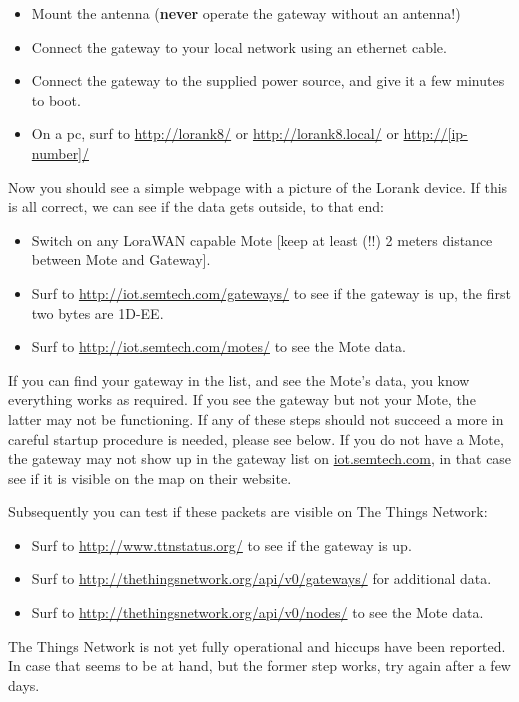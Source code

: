 \documentclass[12pt]{article}
\begin{document}
\begin{itemize}
\item Mount the antenna ({\bf never} operate the gateway without an antenna!)
\item Connect the gateway to your local network using an ethernet cable.
\item Connect the gateway to the supplied power source, and give it a few minutes to boot.
\item On a pc, surf to \url{http://lorank8/} or \url{http://lorank8.local/} or \url{http://[ip-number]/}
\end{itemize}

Now you should see a simple webpage with a picture of the Lorank device. 
If this is all correct, we can see if the data gets outside, to that end:

\begin{itemize}
\item Switch on any LoraWAN capable Mote [keep at least (!!) 2 meters distance between Mote and Gateway].
\item Surf to \url{http://iot.semtech.com/gateways/} to see if the gateway is up, the first two bytes are 1D-EE.
\item Surf to \url{http://iot.semtech.com/motes/} to see the Mote data.  
\end{itemize}
If you can find your gateway in the list, and see the Mote's data, you know everything works
as required. If you see the gateway but not your Mote, the latter may not be functioning.
If any of these steps should not succeed a more in careful startup procedure is needed, please see below.
If you do not have a Mote, the gateway may not show up in the gateway list on \url{iot.semtech.com},
in that case see if it is visible on the map on their website.

Subsequently you can test if these packets are visible on The Things Network:
\begin{itemize}
\item Surf to \url{http://www.ttnstatus.org/} to see if the gateway is up.
\item Surf to \url{http://thethingsnetwork.org/api/v0/gateways/} for additional data.
\item Surf to \url{http://thethingsnetwork.org/api/v0/nodes/} to see the Mote data.
\end{itemize}
The Things Network is not yet fully operational and hiccups have been reported. 
In case that seems to be at hand, but the former step works, try again after a few days.
\end{document}
